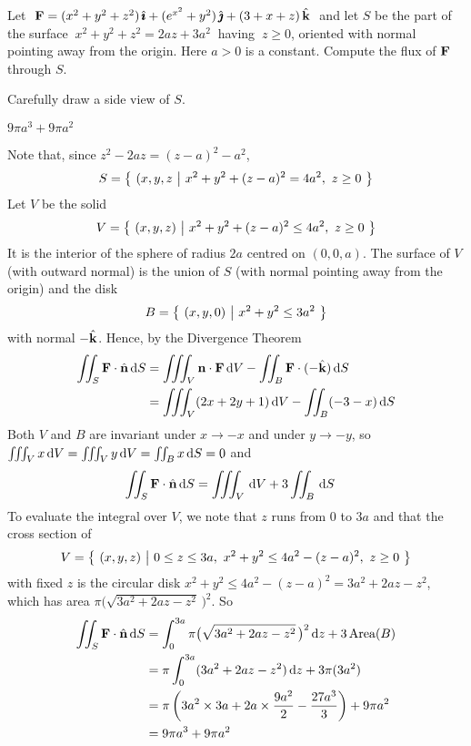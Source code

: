 \begin{question}[M317 2018A] %
Let $\ \mathbf{F}= (x^2+y^2+z^2)\,\hat{\pmb{\imath}}+(e^{x^2}+y^2)\,\hat{\pmb{\jmath}}+(3+x+z)\,\hat{\mathbf{k}}\ $ and 
let $S$ be the part of the surface $\ x^2+y^2+z^2=2az+3a^2\ $ having $\ z\ge 0$,
oriented with normal pointing away from the origin. Here $a>0$
is a constant. Compute the flux of $\mathbf{F}$ through $S$.
\end{question}

\begin{hint} 
Carefully draw a side view of $S$.
\end{hint}

\begin{answer} 
$9\pi a^3+9\pi a^2$
\end{answer}

\begin{solution} 
Note that, since $z^2-2az = (z-a)^2 -a^2$,
\begin{equation*}
S=\big\{ \ (x,y,z\ \big|\  x^2+y^2 +(z-a)^2=4a^2,\ z\ge 0\ \big\}
\end{equation*}
Let $V$ be the solid 
\begin{equation*}
V=\big\{ \ (x,y,z)\ \big|\ x^2+y^2+(z-a)^2\le 4a^2,\ z\ge 0\ \big\}
\end{equation*}
It is the interior of the sphere of radius $2a$ centred on $(0,0,a)$.
The surface of $V$ (with outward normal) is the union of $S$ 
(with normal pointing away from the origin)  and the
disk 
\begin{equation*}
B=\big\{ \ (x,y,0)\ \big|\ x^2+y^2\le 3a^2\ \big\}
\end{equation*}
with normal $-\hat{\mathbf{k}}$. Hence, by the Divergence Theorem
\begin{align*}
\iint_S\mathbf{F}\cdot\hat{\mathbf{n}}\, \mathrm{d}S
&=\iiint_V\mathbf{n}\cdot\mathbf{F}\,\mathrm{d}V-\iint_B\mathbf{F}\cdot(-\hat{\mathbf{k}})\,\mathrm{d}S\\
&=\iiint_V(2x+2y+1)\,\mathrm{d}V-\iint_B(-3-x)\,\mathrm{d}S
\end{align*} 
Both $V$ and $B$ are invariant under $x\rightarrow -x$ and under $y\rightarrow
-y$, so $\iiint_Vx\,\mathrm{d}V=\iiint_Vy\,\mathrm{d}V=\iint_B x\,\mathrm{d}S=0$ and 
\begin{align*}
\iint_S\mathbf{F}\cdot\hat{\mathbf{n}}\, \mathrm{d}S
&=\iiint_V \,\mathrm{d}V+3\iint_B\,\mathrm{d}S
\end{align*}
To evaluate the integral over $V$, we note that $z$ runs from
$0$ to $3a$ and that the cross section
of 
\begin{equation*}
V=\big\{ \ (x,y,z)\ \big|\ 0\le z\le 3a,\ x^2+y^2\le 4a^2-(z-a)^2,\ z\ge 0\ \big\}
\end{equation*}
with fixed $z$ is the circular disk $x^2+y^2\le 4a^2-(z-a)^2
                                                    = 3a^2 +2a z - z^2$,
which has area $\pi\big({\sqrt{3a^2+2az-z^2}\,}\big)^2$.
So
\begin{align*}
\dblInt_S\vF\cdot\hn\, \dee{S}
&%
=\int_0^{3a}\pi\big({\sqrt{3a^2+2az-z^2}\,}\big)^2\,\dee{z}+3\,\text{Area}(B)\\
&=\pi\int_0^{3a}(3a^2+2az-z^2)\,\dee{z}+3\pi(3a^2)\\
&=\pi \left(3a^2\times 3a+2a\times\frac{9a^2}{2}-\frac{27a^3}{3}\right)
        +9\pi a^2 \\
&= 9\pi a^3+9\pi a^2
\end{align*}


\end{solution}
